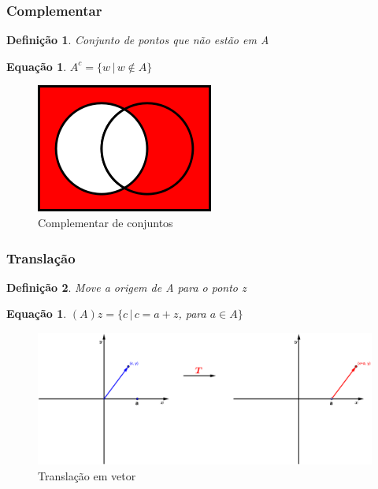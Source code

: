 \documentclass[aspectratio=169]{beamer}
\theoremstyle{Definition}
\newtheorem{defn}{Defini\c c\~ao}
\newtheorem{eq}[theorem]{Equa\c c\~ao}
\begin{document}
\begin{frame}
	\frametitle{Complementar}
	
	\begin{defn}
    	Conjunto de pontos que não estão em A
	\end{defn}

	\begin{eq}
    	$A^{c} = \{w \,|\, w \not\in A  \}$ 
	\end{eq}
	
  \begin{figure}[h]
    \centering
    \includegraphics[height=0.3\paperheight]{imagens/complementar}
    \caption{Complementar de conjuntos}\label{figComplementar}
  \end{figure}
\end{frame}

\begin{frame}
	\frametitle{Translação}
	
	\begin{defn}
    	Move a origem de A para o ponto z
	\end{defn}

	\begin{eq}
    	$(A)z = \{c \,|\, c = a + z$, para $ a \in A  \}$ 
	\end{eq}
	
  \begin{figure}[h]
    \centering
    \includegraphics[height=0.3\paperheight]{imagens/translacao}
    \caption{Translação em vetor}\label{figTranslacao}
  \end{figure}
\end{frame}
\end{document}
